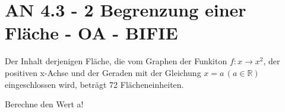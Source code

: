 \section{AN 4.3 - 2 Begrenzung einer Fläche - OA - BIFIE}

\begin{beispiel}[AN 4.3]{1} %
				Der Inhalt derjenigen Fläche, die vom Graphen der Funkiton $f:x\rightarrow x^2$, der positiven x-Achse und der Geraden mit der Gleichung $x=a\,(a\in\mathbb{R})$ eingeschlossen wird, beträgt 72 Flächeneinheiten.
				
				Berechne den Wert a!
				\leer
				
\end{beispiel}